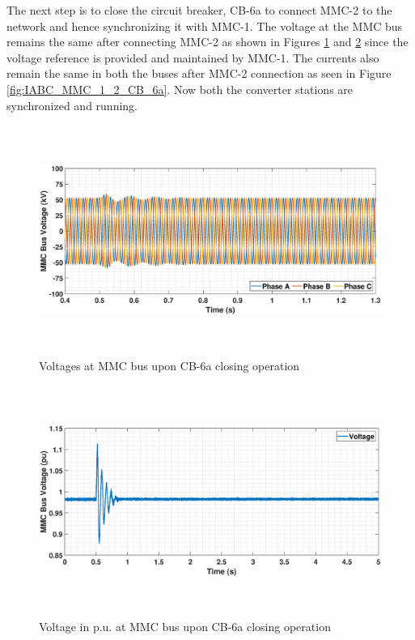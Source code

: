 The next step is to close the circuit breaker, CB-6a to connect \gls{MMC}-2 to the network and hence synchronizing it with \gls{MMC}-1.   The voltage at the \gls{MMC} bus remains the same after connecting \gls{MMC}-2 as shown in Figures \ref{fig:VABC_MMC_1_2_CB_6a} and \ref{fig:VACP_MMC_1_2_CB_6a} since the voltage reference is provided and maintained by \gls{MMC}-1. The currents also remain the same in both the buses after \gls{MMC}-2 connection as seen in Figure \ref{fig:IABC_MMC_1_2_CB_6a}. Now both the converter stations are synchronized and running.


\begin{figure}[H]
    \includegraphics[height = 7.5cm,width = \textwidth]{Diagrams/Chapter_5/VABC_MMC_1_2_CB_6a.eps}
    \caption{Voltages at MMC bus upon CB-6a closing operation}
    \label{fig:VABC_MMC_1_2_CB_6a}
\end{figure}

\begin{figure}[H]
    \includegraphics[height = 7.5cm,width = \textwidth]{Diagrams/Chapter_5/VACP_MMC_1_2_CB_6a.eps}
    \caption{Voltage in p.u. at MMC bus upon CB-6a closing operation}
    \label{fig:VACP_MMC_1_2_CB_6a}
\end{figure}

